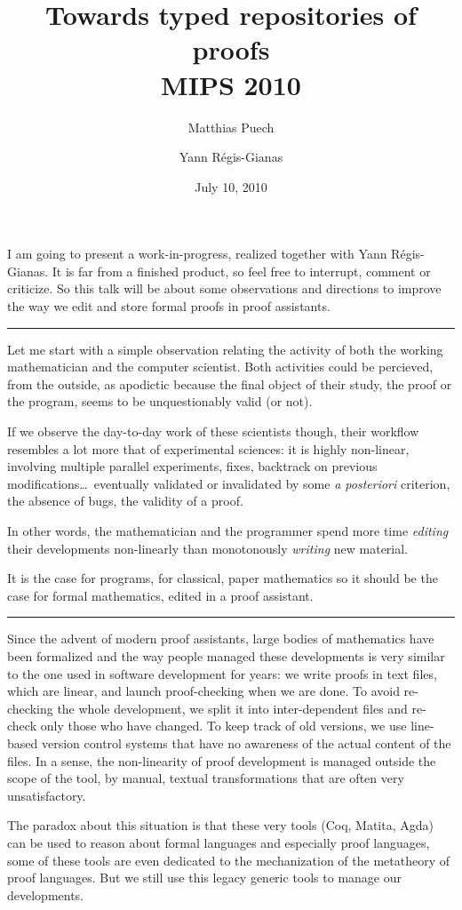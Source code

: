 \documentclass[12pt]{article}
\title{Towards typed repositories of proofs \\[0.6em] 
  \small \textsf{MIPS 2010}}
\date{July 10, 2010}
\author{Matthias Puech \and Yann Régis-Gianas}
\newcommand{\slide}{\vspace{1em} \hrule \vspace{1em}}
\begin{document}
\maketitle

I am going to present a work-in-progress, realized together with Yann
Régis-Gianas. It is far from a finished product, so feel free to
interrupt, comment or criticize. So this talk will be about some
observations and directions to improve the way we edit and store
formal proofs in proof assistants.

\slide

Let me start with a simple observation relating the activity of both
the working mathematician and the computer scientist. Both activities
could be percieved, from the outside, as apodictic because the final
object of their study, the proof or the program, seems to be
unquestionably valid (or not).

If we observe the day-to-day work of these scientists though, their
workflow resembles a lot more that of experimental sciences: it is
highly non-linear, involving multiple parallel experiments, fixes,
backtrack on previous modifications\ldots\ eventually validated or
invalidated by some \emph{a posteriori} criterion, the absence of
bugs, the validity of a proof.

In other words, the mathematician and the programmer spend more time
\emph{editing} their developments non-linearly than monotonously
\emph{writing} new material.

It is the case for programs, for classical, paper mathematics so it
should be the case for formal mathematics, edited in a proof
assistant.

\slide

Since the advent of modern proof assistants, large bodies of
mathematics have been formalized and the way people managed these
developments is very similar to the one used in software development
for years: we write proofs in text files, which are linear, and launch
proof-checking when we are done. To avoid re-checking the whole
development, we split it into inter-dependent files and re-check only
those who have changed. To keep track of old versions, we use
line-based version control systems that have no awareness of the
actual content of the files. In a sense, the non-linearity of proof
development is managed outside the scope of the tool, by manual,
textual transformations that are often very unsatisfactory.

The paradox about this situation is that these very tools (Coq,
Matita, Agda) can be used to reason about formal languages and
especially proof languages, some of these tools are even dedicated to
the mechanization of the metatheory of proof languages. But we still
use this legacy generic tools to manage our developments.
\end{document}

